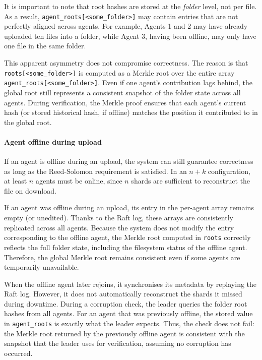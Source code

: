 It is important to note that root hashes are stored at the \emph{folder} level, not per file. As a result, \texttt{agent\_roots[<some\_folder>]} may contain entries that are not perfectly aligned across agents. For example, Agents 1 and 2 may have already uploaded ten files into a folder, while Agent 3, having been offline, may only have one file in the same folder.  

This apparent asymmetry does not compromise correctness. The reason is that \texttt{roots[<some\_folder>]} is computed as a Merkle root over the entire array \texttt{agent\_roots[<some\_folder>]}. Even if one agent's contribution lags behind, the global root still represents a consistent snapshot of the folder state across all agents. During verification, the Merkle proof ensures that each agent's current hash (or stored historical hash, if offline) matches the position it contributed to in the global root.  

\paragraph{Agent offline during upload}

If an agent is offline during an upload, the system can still guarantee correctness as long as the Reed-Solomon requirement is satisfied. In an $n+k$ configuration, at least $n$ agents must be online, since $n$ shards are sufficient to reconstruct the file on download.

If an agent was offline during an upload, its entry in the per-agent array remains empty (or unedited). Thanks to the Raft log, these arrays are consistently replicated across all agents. Because the system does not modify the entry corresponding to the offline agent, the Merkle root computed in \texttt{roots} correctly reflects the full folder state, including the filesystem status of the offline agent. Therefore, the global Merkle root remains consistent even if some agents are temporarily unavailable.

When the offline agent later rejoins, it synchronises its metadata by replaying the Raft log. However, it does not automatically reconstruct the shards it missed during downtime. During a corruption check, the leader queries the folder root hashes from all agents. For an agent that was previously offline, the stored value in \texttt{agent\_roots} is exactly what the leader expects. Thus, the check does not fail: the Merkle root returned by the previously offline agent is consistent with the snapshot that the leader uses for verification, assuming no corruption has occurred.

